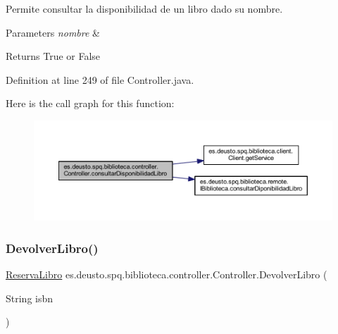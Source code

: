 Permite consultar la disponibilidad de un libro dado su nombre. 
\begin{DoxyParams}{Parameters}
{\em nombre} & \\
\hline
\end{DoxyParams}
\begin{DoxyReturn}{Returns}
True or False 
\end{DoxyReturn}


Definition at line 249 of file Controller.\+java.

Here is the call graph for this function\+:
\nopagebreak
\begin{figure}[H]
\begin{center}
\leavevmode
\includegraphics[width=350pt]{classes_1_1deusto_1_1spq_1_1biblioteca_1_1controller_1_1_controller_a45eb78b5f7d62253b68366a9fdb450e2_cgraph}
\end{center}
\end{figure}
\mbox{\label{classes_1_1deusto_1_1spq_1_1biblioteca_1_1controller_1_1_controller_abe34befc3a9ab68e3686c9251b2c912e}} 
\subsubsection{\texorpdfstring{Devolver\+Libro()}{DevolverLibro()}}
{\footnotesize\ttfamily \mbox{\hyperlink{classes_1_1deusto_1_1spq_1_1biblioteca_1_1data_1_1_reserva_libro}{Reserva\+Libro}} es.\+deusto.\+spq.\+biblioteca.\+controller.\+Controller.\+Devolver\+Libro (\begin{DoxyParamCaption}\item[{String}]{isbn }\end{DoxyParamCaption})}


